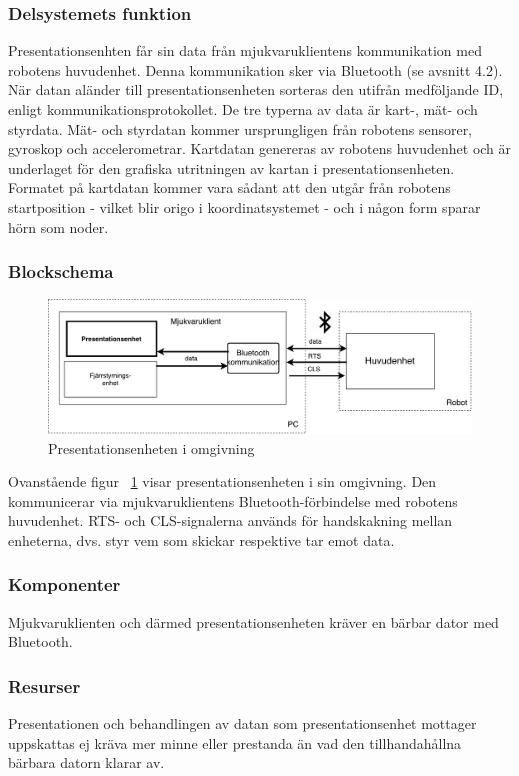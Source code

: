 \documentclass{article}
\begin{document}
\subsubsection{Delsystemets funktion}
Presentationsenhten får sin data från mjukvaruklientens kommunikation med robotens huvudenhet. Denna kommunikation sker via Bluetooth (se avsnitt 4.2). När datan aländer till presentationsenheten sorteras den utifrån medföljande ID, enligt kommunikationsprotokollet. De tre typerna av data är kart-, mät- och styrdata. Mät- och styrdatan kommer ursprungligen från robotens sensorer, gyroskop och accelerometrar. Kartdatan genereras av robotens huvudenhet och är underlaget för den grafiska utritningen av kartan i presentationsenheten. Formatet på kartdatan kommer vara sådant att den utgår från robotens startposition - vilket blir origo i koordinatsystemet - och i någon form sparar hörn som noder. 

\subsubsection{Blockschema}
\begin{figure}[H]
\includegraphics[scale=0.5]{Oversikt_presentationsenhet2}
\caption{Presentationsenheten i omgivning}
\label{fig:Oversikt_presentationsenhet2}
\end{figure}
Ovanstående figur ~\ref{fig:Oversikt_presentationsenhet2} visar presentationsenheten i sin omgivning. Den kommunicerar via mjukvaruklientens Bluetooth-förbindelse med robotens huvudenhet. RTS- och CLS-signalerna används för handskakning mellan enheterna, dvs. styr vem som skickar respektive tar emot data.  

\subsubsection{Komponenter}
Mjukvaruklienten och därmed presentationsenheten kräver en bärbar dator med Bluetooth. 

\subsubsection{Resurser}
Presentationen och behandlingen av datan som presentationsenhet mottager uppskattas ej kräva mer minne eller prestanda än vad den tillhandahållna bärbara datorn klarar av.
\end{document}
